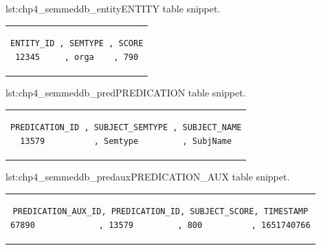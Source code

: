 \begin{minipage}{\linewidth}
\begin{captionedlisting}{lst:chp4_semmeddb_entity}{ENTITY table snippet.}
\centering
\begin{tabular}{c}
{
\begin{lstlisting}[basicstyle=\ttfamily\small,label={list:example1},columns=flexible]
ENTITY_ID , SEMTYPE , SCORE
12345     , orga    , 790
\end{lstlisting}
}
\end{tabular}
\end{captionedlisting}
\end{minipage}

\begin{minipage}{\linewidth}
\begin{captionedlisting}{lst:chp4_semmeddb_pred}{PREDICATION table snippet.}
\centering
\begin{tabular}{c}
{
\begin{lstlisting}[basicstyle=\ttfamily\small,label={list:example1},columns=flexible]
PREDICATION_ID , SUBJECT_SEMTYPE , SUBJECT_NAME
13579          , Semtype         , SubjName
\end{lstlisting}
}
\end{tabular}
\end{captionedlisting}
\end{minipage}

\begin{minipage}{\linewidth}
\begin{captionedlisting}{lst:chp4_semmeddb_predaux}{PREDICATION\_AUX table snippet.}
\centering
\begin{tabular}{c}
{
\begin{lstlisting}[basicstyle=\ttfamily\small,label={list:example1},columns=flexible]
PREDICATION_AUX_ID, PREDICATION_ID, SUBJECT_SCORE, TIMESTAMP
67890             , 13579         , 800          , 1651740766
\end{lstlisting}
}
\end{tabular}
\end{captionedlisting}
\end{minipage}

